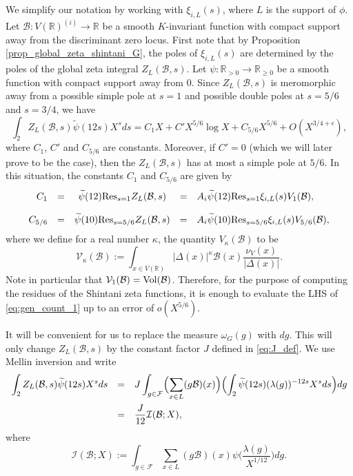 \documentclass{article}
\def\Res{{\rm Res}}
\def\Vol{{\rm Vol}}
\def\R{{\mathbb R}}
\def\cB{{\mathcal B}}
\def\FF{{\mathcal F}}
\def\V{{\mathcal V}}
\def\I{{\mathcal I}}
\def\wt{\widetilde}
\begin{document}
We simplify our notation by working with $\xi_{i,L}(s)$, where $L$ is the support of $\phi$. Let $\cB:V(\R)^{(i)}\to\R$ be a smooth $K$-invariant function with compact support away from the discriminant zero locus.
First note that by Proposition \ref{prop_global_zeta_shintani_G}, the poles of $\xi_{i,L}(s)$ are determined by the poles of the global zeta integral $Z_L(\cB,s)$.
Let $\psi:\R_{>0}\to\R_{\geq 0}$ be a smooth function with compact support away from $0$. Since $Z_L(\cB,s)$ is meromorphic away from a possible simple pole at $s=1$ and possible double poles at $s=5/6$ and $s=3/4$, we have
\begin{equation}\label{eq:gen_count_1}
\int_{2}Z_L(\cB,s)\wt{\psi}(12s)X^sds=C_1X+C'X^{5/6}\log X+C_{5/6}X^{5/6}+O(X^{3/4+\epsilon}),
\end{equation}
where $C_1$, $C'$ and $C_{5/6}$ are constants. Moreover, if $C'=0$ (which we will later prove to be the case), then the $Z_L(\cB,s)$ has at most a simple pole at $5/6$. In this situation, the constants $C_1$ and $C_{5/6}$ are given by
\begin{equation}\label{eq:residues_of_GZI}
\begin{array}{rcccl}
C_1&=&\wt{\psi}(12)\Res_{s=1}Z_L(\cB,s)
&=&A_i\displaystyle\wt{\psi}(12)\Res_{s=1}\xi_{i,L}(s)V_1(\cB),
\\[.15in]
C_{5/6}&=&\wt{\psi}(10)\Res_{s=5/6}Z_L(\cB,s)
&=&A_i\displaystyle\wt{\psi}(10)\Res_{s=5/6}\xi_{i,L}(s)V_{5/6}(\cB),
\end{array}
\end{equation}
where we define for a real number $\kappa$, the quantity $V_\kappa(\cB)$ to be
\begin{equation}
\V_\kappa(\cB):=\int_{x\in V(\R)}|\Delta(x)|^{\kappa}\cB(x)\frac{\nu_V(x)}{|\Delta(x)|}.
\end{equation}
Note in particular that $\V_1(\cB)=\Vol(\cB)$.
Therefore, for the purpose of computing the residues of the Shintani zeta functions, it is enough to evaluate the LHS of \eqref{eq:gen_count_1} up to an error of $o(X^{5/6})$.

It will be convenient for us to replace the measure $\omega_G(g)$ with $dg$. This will only change $Z_L(\cB,s)$ by the constant factor $J$ defined in \eqref{eq:J_def}.
We use Mellin inversion and write
\begin{equation}\label{eq:GZI_to_I}
\begin{array}{rcl}
\displaystyle \int_{2}Z_L(\cB,s)\wt{\psi}(12s)X^sds &=&
\displaystyle J\int_{g\in\FF} \Bigl(\sum_{x\in L}(g\cB)(x)\Bigr)
\Bigl(\int_{2}\wt{\psi}(12s)(\lambda(g))^{-12s}X^sds\Bigr)dg
\\[.2in]&=&\displaystyle
\frac{J}{12}\I(\cB;X),
\end{array}
\end{equation}
where
\begin{equation}\label{eq:I-def}
\I(\cB;X):=\int_{g\in\FF}\sum_{x\in L}(g\cB)(x)\psi\Big(\frac{\lambda(g)}{X^{1/12}}\Big)dg.
\end{equation}
\end{document}
